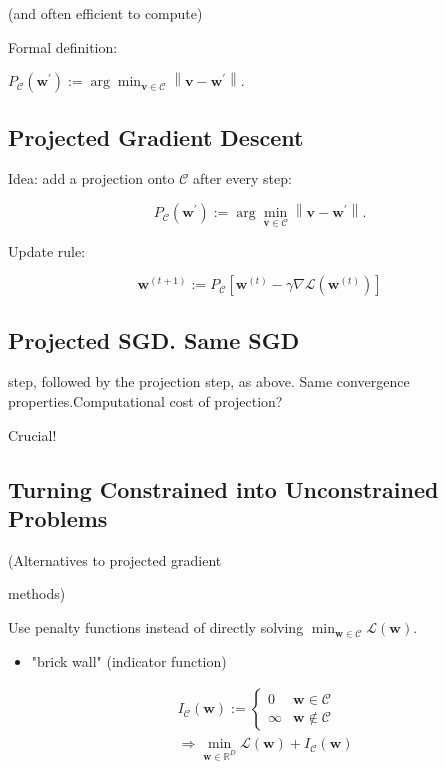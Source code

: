 (and often efficient to compute)

Formal definition:

$P_{\mathcal{C}}\left(\mathbf{w}^{\prime}\right):=\arg \min _{\mathbf{v} \in \mathcal{C}}\left\|\mathbf{v}-\mathbf{w}^{\prime}\right\|$.

\subsection*{Projected Gradient Descent}
Idea: add a projection onto $\mathcal{C}$ after every step:

$$
P_{\mathcal{C}}\left(\mathbf{w}^{\prime}\right):=\arg \min _{\mathbf{v} \in \mathcal{C}}\left\|\mathbf{v}-\mathbf{w}^{\prime}\right\| .
$$

Update rule:

$$
\mathbf{w}^{(t+1)}:=P_{\mathcal{C}}\left[\mathbf{w}^{(t)}-\gamma \nabla \mathcal{L}\left(\mathbf{w}^{(t)}\right)\right]
$$


\subsection*{Projected SGD. Same SGD}
 step, followed by the projection step, as above. Same convergence properties.Computational cost of projection?

Crucial!

\subsection*{Turning Constrained into Unconstrained Problems}
(Alternatives to projected gradient

methods)

Use penalty functions instead of directly solving $\min _{\mathbf{w} \in \mathcal{C}} \mathcal{L}(\mathbf{w})$.

\begin{itemize}
  \item "brick wall" (indicator function)
\end{itemize}

$$
\begin{aligned}
& I_{\mathcal{C}}(\mathbf{w}):= \begin{cases}0 & \mathbf{w} \in \mathcal{C} \\
\infty & \mathbf{w} \notin \mathcal{C}\end{cases} \\
& \Rightarrow \min _{\mathbf{w} \in \mathbb{R}^{D}} \mathcal{L}(\mathbf{w})+I_{\mathcal{C}}(\mathbf{w})
\end{aligned}
$$

